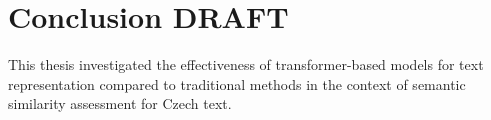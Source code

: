 
\chapter{Conclusion DRAFT\label{chap:conclusion}}






This thesis investigated the effectiveness of transformer-based models for text representation compared to traditional methods in the context of semantic similarity assessment for Czech text.

